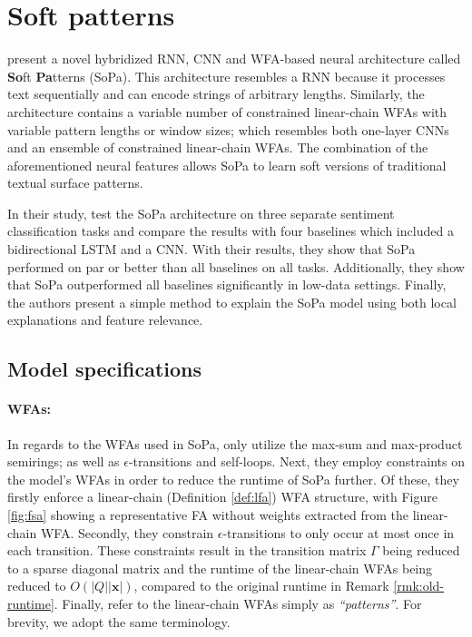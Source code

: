 \section{Soft patterns}

\label{section:soft-patterns}

\citet{schwartz2018sopa} present a novel hybridized RNN, CNN and WFA-based neural architecture called \textbf{So}ft \textbf{Pa}tterns (SoPa). This architecture resembles a RNN because it processes text sequentially and can encode strings of arbitrary lengths. Similarly, the architecture contains a variable number of constrained linear-chain WFAs with variable pattern lengths or window sizes; which resembles both one-layer CNNs and an ensemble of constrained linear-chain WFAs. The combination of the aforementioned neural features allows SoPa to learn soft versions of traditional textual surface patterns.

In their study, \citet{schwartz2018sopa} test the SoPa architecture on three separate sentiment classification tasks and compare the results with four baselines which included a bidirectional LSTM and a CNN. With their results, they show that SoPa performed on par or better than all baselines on all tasks. Additionally, they show that SoPa outperformed all baselines significantly in low-data settings. Finally, the authors present a simple method to explain the SoPa model using both local explanations and feature relevance.

\subsection{Model specifications}

\paragraph{WFAs:} In regards to the WFAs used in SoPa, \citet{schwartz2018sopa} only utilize the max-sum and max-product semirings; as well as $\epsilon$-transitions and self-loops. Next, they employ constraints on the model's WFAs in order to reduce the runtime of SoPa further. Of these, they firstly enforce a linear-chain (Definition \ref{def:lfa}) WFA structure, with Figure \ref{fig:fsa} showing a representative FA without weights extracted from the linear-chain WFA. Secondly, they constrain $\epsilon$-transitions to only occur at most once in each transition. These constraints result in the transition matrix $\Gamma$ being reduced to a sparse diagonal matrix and the runtime of the linear-chain WFAs being reduced to $O(|Q||\pmb{x}|)$, compared to the original runtime in Remark \ref{rmk:old-runtime}. Finally, \citet[Page 3, Section 3.1]{schwartz2018sopa} refer to the linear-chain WFAs simply as \textit{``patterns''}. For brevity, we adopt the same terminology.

